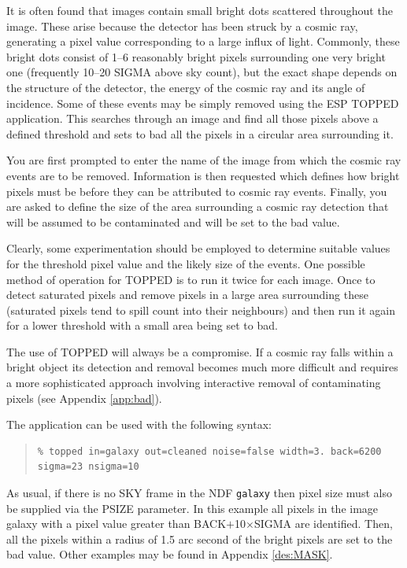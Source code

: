 \documentclass[twoside,11pt]{article}
\newenvironment{myquote}{\begin{quote}\begin{small}}{\end{small}\end{quote}}
\begin{document}
It is often found that images contain small bright dots scattered throughout
the image. These arise because the detector has been struck by a cosmic ray,
generating a pixel value corresponding to a large influx of light. Commonly,
these bright dots consist of 1--6 reasonably bright pixels surrounding one
very bright one (frequently 10--20 SIGMA above sky count), but
the exact shape depends on the structure of the detector, the energy of
the cosmic ray and its angle of incidence. Some of these events may be
simply removed using the ESP TOPPED application. This searches
through an image and find all those pixels above a defined threshold and
sets to bad all the pixels in a circular area surrounding it.

You are first
prompted to enter the name of the image from which the cosmic ray events are
to be removed. Information is then requested which defines how bright pixels
must be before they can be attributed to cosmic ray events. Finally, you are
asked to define
the size of the area surrounding a cosmic ray detection that will be
assumed to be contaminated and will be set to the bad value.

Clearly, some experimentation should be employed to determine
suitable values for the threshold pixel value and the likely size of the
events. One possible method of operation for TOPPED is to run it twice for
each image. Once to detect saturated pixels and remove pixels in a
large area surrounding these (saturated pixels tend to spill count into
their neighbours) and then run it again for a lower threshold with a small area
being set to bad.

The use of TOPPED will always be a compromise. If a cosmic ray falls
within a bright object its detection and removal becomes much more
difficult and requires a more sophisticated approach involving
interactive removal of contaminating pixels (see Appendix \ref{app:bad}).

The application can be used with the following syntax:

\begin{myquote}
\begin{verbatim}
% topped in=galaxy out=cleaned noise=false width=3. back=6200 sigma=23 nsigma=10
\end{verbatim}
\end{myquote}

As usual, if there is no SKY frame in the NDF {\tt galaxy}
then pixel size must also be supplied via the PSIZE parameter.
In this example all pixels in the image galaxy with a pixel value
greater than BACK$+$10$\times$SIGMA are identified. Then, all the pixels
within a radius of 1.5 arc second of the bright pixels are set to the
bad value. Other examples may be found in Appendix \ref{des:MASK}.
\end{document}
